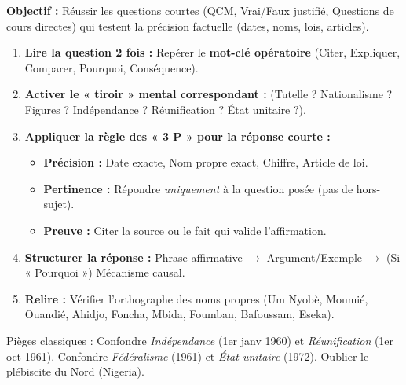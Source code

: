 \documentclass[11pt]{article}
\newcommand{\cle}[1]{{\popxbold\color{popdark}#1}}
\begin{document}
\begin{methode}
\textbf{Objectif :} Réussir les questions courtes (QCM, Vrai/Faux justifié, Questions de cours directes) qui testent la précision factuelle (dates, noms, lois, articles).
\begin{enumerate}
    \item \textbf{Lire la question 2 fois :} Repérer le \textbf{mot-clé opératoire} (Citer, Expliquer, Comparer, Pourquoi, Conséquence).
    \item \textbf{Activer le « tiroir » mental correspondant :} (Tutelle ? Nationalisme ? Figures ? Indépendance ? Réunification ? État unitaire ?).
    \item \textbf{Appliquer la règle des « 3 P » pour la réponse courte :}
        \begin{itemize}
            \item \textbf{Précision :} Date exacte, Nom propre exact, Chiffre, Article de loi.
            \item \textbf{Pertinence :} Répondre \emph{uniquement} à la question posée (pas de hors-sujet).
            \item \textbf{Preuve :} Citer la source ou le fait qui valide l'affirmation.
        \end{itemize}
    \item \textbf{Structurer la réponse :} Phrase affirmative $\rightarrow$ Argument/Exemple $\rightarrow$ (Si « Pourquoi ») Mécanisme causal.
    \item \textbf{Relire :} Vérifier l'orthographe des noms propres (Um Nyobè, Moumié, Ouandié, Ahidjo, Foncha, Mbida, Foumban, Bafoussam, Eseka).
\end{enumerate}
\cle{Pièges classiques :} Confondre \textit{Indépendance} (1er janv 1960) et \textit{Réunification} (1er oct 1961). Confondre \textit{Fédéralisme} (1961) et \textit{État unitaire} (1972). Oublier le plébiscite du Nord (Nigeria).
\end{methode}
\end{document}
